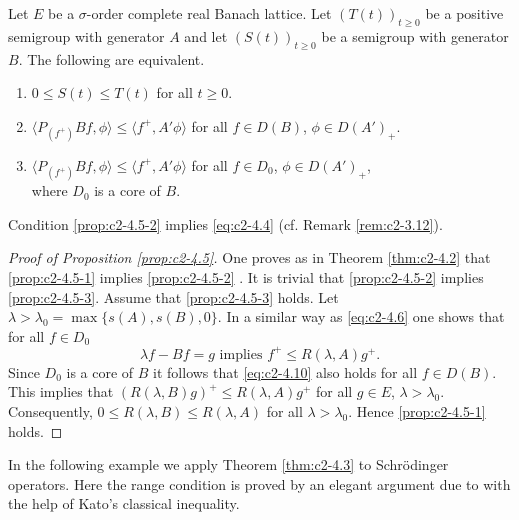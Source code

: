 \begin{proposition}\label{prop:c2-4.5}
Let $E$ be a $\sigma$-order complete real Banach lattice.
Let $(T(t))_{t \geq 0}$ be a positive semigroup with generator $A$ and let
$(S(t))_{t \geq 0}$ be a semigroup with generator $B$. The following are equivalent.
\begin{enumerate}[\upshape (a)]
\item \label{prop:c2-4.5-1}
$0 \leq S(t) \leq T(t)$ for all $t \geq 0$.
\item \label{prop:c2-4.5-2}
$\langle P_{(f^{+})}Bf,\phi\rangle \leq \langle f^{+},A'\phi\rangle$ for all $f \in D(B)$, $\phi \in D(A')_{+}$.
\item \label{prop:c2-4.5-3}
$\langle P_{(f^{+})}Bf,\phi\rangle \leq \langle f^{+},A'\phi\rangle$ for all $f \in D_{0}$, $\phi \in D(A')_{+}$,\\
where $D_{0}$ is a core of $B$.
\end{enumerate}
\end{proposition}
\begin{remark}\label{rem:c2-4.6}
Condition \ref{prop:c2-4.5-2}   implies \eqref{eq:c2-4.4} (cf. Remark \ref{rem:c2-3.12}).
\end{remark}
\begin{proof}[Proof of Proposition \ref{prop:c2-4.5}]
One proves as in Theorem \ref{thm:c2-4.2}   that \ref{prop:c2-4.5-1} implies \ref{prop:c2-4.5-2}  .
It is trivial that \ref{prop:c2-4.5-2}   implies \ref{prop:c2-4.5-3}. 
Assume that \ref{prop:c2-4.5-3}   holds. 
Let $\lambda > \lambda_{0} = \max \{s(A),s(B),0\}$. 
In a similar way as \eqref{eq:c2-4.6} one shows that for all $f \in D_{0}$
\begin{equation}\label{eq:c2-4.10}
\lambda f - Bf = g \text{ implies } f^{+} \leq R(\lambda,A)g^{+}.
\end{equation}
Since $D_{0}$ is a core of $B$ it follows that \eqref{eq:c2-4.10} also holds for all $f \in D(B)$. 
This implies that $(R(\lambda,B)g)^{+} \leq R(\lambda,A)g^{+}$ for all $g \in E$, $\lambda > \lambda_{0}$. 
Consequently, $0 \leq R(\lambda,B) \leq R(\lambda,A)$ for all $\lambda > \lambda_{0}$. 
Hence \ref{prop:c2-4.5-1}   holds.
\end{proof}

In the following example we apply Theorem \ref{thm:c2-4.3} to Schrödinger operators. 
Here the range condition is proved by an elegant argument due to \citet{kato:1986} with the help of Kato's classical inequality.

